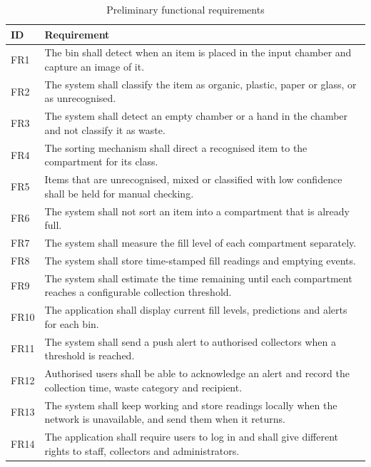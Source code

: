 \documentclass[12pt,a4paper]{report}
\begin{document}
\begin{table}[htbp]
\centering
\small
\renewcommand{\arraystretch}{1.25}
\begin{tabular}{>{\raggedright\arraybackslash}p{1.1cm}>{\raggedright\arraybackslash}p{10.8cm}}
\hline
\textbf{ID} & \textbf{Requirement}\\
\hline
FR1 & The bin shall detect when an item is placed in the input chamber and capture an image of it.\\
FR2 & The system shall classify the item as organic, plastic, paper or glass, or as unrecognised.\\
FR3 & The system shall detect an empty chamber or a hand in the chamber and not classify it as waste.\\
FR4 & The sorting mechanism shall direct a recognised item to the compartment for its class.\\
FR5 & Items that are unrecognised, mixed or classified with low confidence shall be held for manual checking.\\
FR6 & The system shall not sort an item into a compartment that is already full.\\
FR7 & The system shall measure the fill level of each compartment separately.\\
FR8 & The system shall store time-stamped fill readings and emptying events.\\
FR9 & The system shall estimate the time remaining until each compartment reaches a configurable collection threshold.\\
FR10 & The application shall display current fill levels, predictions and alerts for each bin.\\
FR11 & The system shall send a push alert to authorised collectors when a threshold is reached.\\
FR12 & Authorised users shall be able to acknowledge an alert and record the collection time, waste category and recipient.\\
FR13 & The system shall keep working and store readings locally when the network is unavailable, and send them when it returns.\\
FR14 & The application shall require users to log in and shall give different rights to staff, collectors and administrators.\\
\hline
\end{tabular}
\caption{Preliminary functional requirements}
\label{tab:fr}
\end{table}
\end{document}
